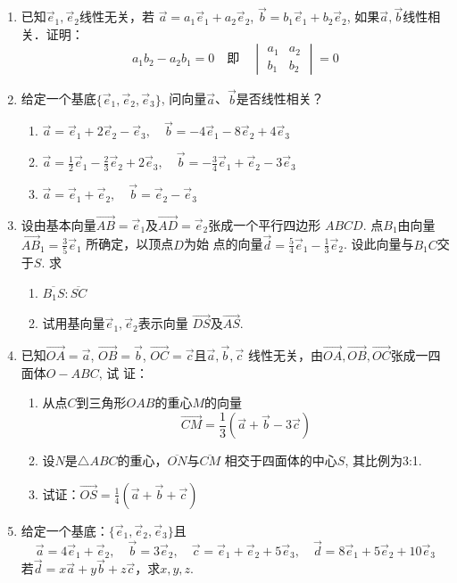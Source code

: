 \begin{ex}
\begin{enumerate}
    \item  已知$\vec{e}_1,\vec{e}_2$线性无关，若
    $\vec{a}=a_1\vec{e}_1+a_2\vec{e}_2$, $\vec{b}=b_1\vec{e}_1+b_2\vec{e}_2$,
    如果$\vec{a},\vec{b}$线性相关．证明：
   \[ a_1b_2-a_2b_1=0\quad \text{即}\quad \begin{vmatrix}
       a_1&a_2\\b_1&b_2
   \end{vmatrix}=0\]
\item 给定一个基底$\{\vec{e}_1,\vec{e}_2,\vec{e}_3\}$,
    问向量$\vec{a}$、$\vec{b}$是否线性相关？
\begin{enumerate}
    \item $\vec{a}=\vec{e}_1+2\vec{e}_2-\vec{e}_3,\quad \vec{b}=-4\vec{e}_1-8\vec{e}_2+4\vec{e}_3$
    \item $\vec{a}=\frac{1}{2}\vec{e}_1-\frac{2}{3}\vec{e}_2+2\vec{e}_3,\quad \vec{b}=-\frac{3}{4}\vec{e}_1+\vec{e}_2-3\vec{e}_3$
    \item $\vec{a}=\vec{e}_1+\vec{e}_2,\quad \vec{b}=\vec{e}_2-\vec{e}_3$
\end{enumerate}
\item 设由基本向量$\Vec{AB}=\vec{e}_1$及$\Vec{AD}=\vec{e}_2$张成一个平行四边形
    $ABCD$. 点$B_1$由向量
    $\Vec{AB}_1=\frac{3}{5}\vec{e}_1$
    所确定，以顶点$D$为始
    点的向量$\vec{d}=\frac{5}{4}\vec{e}_1-\frac{1}{3}\vec{e}_2$. 
    设此向量与$B_1C$交于$S$. 求
\begin{enumerate}
    \item $\overline{B_1S}:\overline{SC}$
    \item 试用基向量$\vec{e}_1,\vec{e}_2$表示向量
    $\Vec{DS}$及$\Vec{AS}$.
\end{enumerate}
\item 已知$\Vec{OA}=\vec{a}$, $\Vec{OB}=\vec{b}$, $\Vec{OC}=\vec{c}$且$\vec{a},\vec{b},\vec{c}$
    线性无关，由$\Vec{OA},\Vec{OB},\Vec{OC}$张成一四面体$O-ABC$, 试
    证：
\begin{enumerate}
    \item 从点$C$到三角形$OAB$的重心$M$的向量
    \[\Vec{CM}=\frac{1}{3}\left(\vec{a}+\vec{b}-3\vec{c}\right)\]
    \item 设$N$是$\triangle ABC$的重心，$\overline{ON}$与$\overline{CM}$ 相交于四面体的中心$S$, 其比例为3:1.
    \item 试证：$\Vec{OS}=\frac{1}{4}\left(\vec{a}+\vec{b}+\vec{c}\right)$
\end{enumerate}
    
\item 给定一个基底：$\{\vec{e}_1,\vec{e}_2,\vec{e}_3\}$且
\[\vec{a}=4\vec{e}_1+\vec{e}_2,\quad \vec{b}=3\vec{e}_2,\quad \vec{c}=\vec{e}_1+\vec{e}_2+5\vec{e}_3,\quad \vec{d}=8\vec{e}_1+5\vec{e}_2+10\vec{e}_3\]
若$\vec{d}=x\vec{a}+y\vec{b}+z\vec{c}$，求$x,y,z$.
\end{enumerate}
\end{ex}

